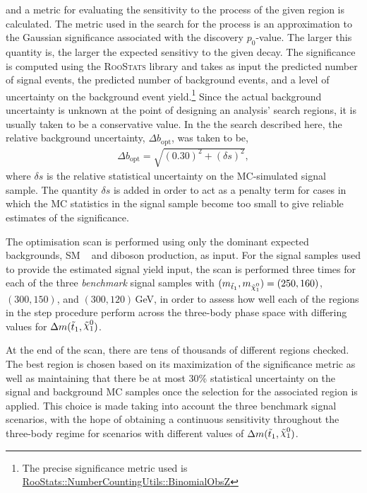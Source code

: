 and a metric for evaluating the sensitivity to the \bWN process of the given region
is calculated.
The metric used in the search for the \bWN process is an approximation to the Gaussian significance
associated with the discovery $p_0$-value.
The larger this quantity is, the larger the expected sensitivy to the given \bWN decay.
The significance is computed using the \textsc{RooStats} library and takes as input
the predicted number of signal events, the predicted number of background events,
and a level of uncertainty on the background event yield.\footnote{The precise
significance metric used is \href{https://root.cern.ch/doc/v606/namespaceRooStats_1_1NumberCountingUtils.html\#a4ac05df7796855dca2d8b24473bf7d4e}{RooStats::NumberCountingUtils::BinomialObsZ} 
}
Since the actual background uncertainty is unknown at the point of designing an analysis'
search regions, it is usually taken to be a conservative value.
In the the search described here, the relative background uncertainty, $\Delta b_{\text{opt}}$, was taken to be,
\begin{align*}
    \Delta b_{\text{opt}} = \sqrt{ (0.30)^2 + (\delta s)^2 },
\end{align*}
where $\delta s$ is the relative statistical uncertainty on the MC-simulated signal sample.
The quantity $\delta s$ is added in order to act as a penalty term for cases in which the
MC statistics in the signal sample become too small to give reliable estimates of the significance.

The optimisation scan is performed using only the dominant expected backgrounds, SM \ttbar~ and diboson production,
as input.
For the signal samples used to provide the estimated signal yield input,
the scan is performed three times for each of the three \textit{benchmark} signal samples with $\msn = (250, 160)$, $(300,150)$, and $(300,120)$\,GeV,
in order to assess how well each of the regions in the step procedure perform
across the three-body phase space with differing values for $\sdiff$.

At the end of the scan, there are tens of thousands of different regions checked.
The best region is chosen based on its maximization of the significance metric as well as
maintaining that there be at most 30\% statistical uncertainty on the signal and background MC samples
once the selection for the associated region is applied.
This choice is made taking into account the three benchmark \bWN signal scenarios, with the hope
of obtaining a continuous sensitivity throughout the three-body regime for scenarios
with different values of $\sdiff$.

